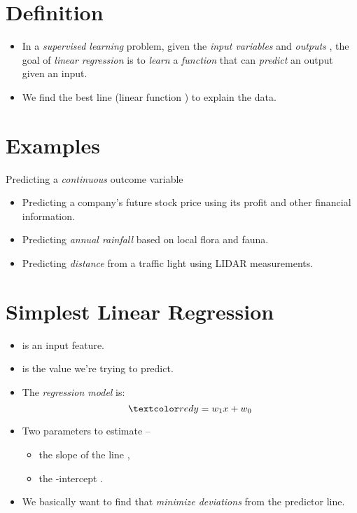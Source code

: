 \documentclass[
	number={5},
	title={Linear Regression}
]{cs584notes}
\begin{document}
\section{Definition}\label{sec:definition}
\begin{itemize}
	\item In a \emph{supervised learning} problem, given the \emph{input variables}  and \emph{outputs} , the goal of \emph{linear regression} is to \emph{learn} a \emph{function} that can \emph{predict} an output given an input.
	\item We find the best line (linear function ) to explain the data.
\end{itemize}

\section{Examples}\label{sec:examples}
Predicting a \emph{continuous} outcome variable
\begin{itemize}
	\item Predicting a company's future stock price using its profit and other financial information.
	\item Predicting \emph{annual rainfall} based on local flora and fauna.
	\item Predicting \emph{distance} from a traffic light using LIDAR measurements.
\end{itemize}

\section{Simplest Linear Regression}\label{sec:simplest-linear-regression}
\begin{itemize}
	\item {} is an input feature.
	\item {} is the value we're trying to predict.
	\item The \emph{regression model} is:
	\[ \data{ y = w_{1}x + w_{0} } \]
	\item Two parameters to estimate --
	\begin{itemize}
		\item the slope of the line ,
		\item the -intercept .
	\end{itemize}
	\item We basically want to find  that \emph{minimize deviations} from the predictor line.
\end{itemize}
\end{document}
